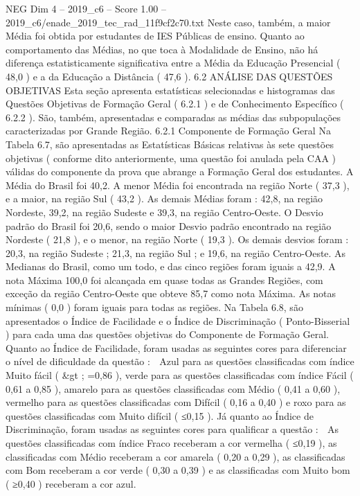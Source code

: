 \begin{textsample}{NEG Dim 4 – 2019\_c6 – Score 1.00 – 2019\_c6/enade\_2019\_tec\_rad\_11f9cf2c70.txt}
Neste caso, também, a maior Média foi obtida por estudantes de IES Públicas de ensino.
Quanto ao comportamento das Médias, no que toca à Modalidade de Ensino, não há diferença estatisticamente significativa entre a Média da Educação Presencial ( 48,0 ) e a da Educação a Distância ( 47,6 ). 6.2 ANÁLISE DAS QUESTÕES OBJETIVAS Esta seção apresenta estatísticas selecionadas e histogramas das Questões Objetivas de Formação Geral ( 6.2.1 ) e de Conhecimento Específico ( 6.2.2 ).
São, também, apresentadas e comparadas as médias das subpopulações caracterizadas por Grande Região. 6.2.1 Componente de Formação Geral Na Tabela 6.7, são apresentadas as Estatísticas Básicas relativas às sete questões objetivas ( conforme dito anteriormente, uma questão foi anulada pela CAA ) válidas do componente da prova que abrange a Formação Geral dos estudantes.
A Média do Brasil foi 40,2.
A menor Média foi encontrada na região Norte ( 37,3 ), e a maior, na região Sul ( 43,2 ).
As demais Médias foram : 42,8, na região Nordeste, 39,2, na região Sudeste e 39,3, na região Centro-Oeste.
O Desvio padrão do Brasil foi 20,6, sendo o maior Desvio padrão encontrado na região Nordeste ( 21,8 ), e o menor, na região Norte ( 19,3 ).
Os demais desvios foram : 20,3, na região Sudeste ; 21,3, na região Sul ; e 19,6, na região Centro-Oeste.
As Medianas do Brasil, como um todo, e das cinco regiões foram iguais a 42,9.
A nota Máxima 100,0 foi alcançada em quase todas as Grandes Regiões, com exceção da região Centro-Oeste que obteve 85,7 como nota Máxima.
As notas mínimas ( 0,0 ) foram iguais para todas as regiões.
Na Tabela 6.8, são apresentados o Índice de Facilidade e o Índice de Discriminação ( Ponto-Bisserial ) para cada uma das questões objetivas do Componente de Formação Geral.
Quanto ao Índice de Facilidade, foram usadas as seguintes cores para diferenciar o nível de dificuldade da questão :  Azul para as questões classificadas com índice Muito fácil ( \&gt ; =0,86 ), verde para as questões classificadas com índice Fácil ( 0,61 a 0,85 ), amarelo para as questões classificadas com Médio ( 0,41 a 0,60 ), vermelho para as questões classificadas com Difícil ( 0,16 a 0,40 ) e roxo para as questões classificadas com Muito difícil ( ≤0,15 ).
Já quanto ao Índice de Discriminação, foram usadas as seguintes cores para qualificar a questão :  As questões classificadas com índice Fraco receberam a cor vermelha ( ≤0,19 ), as classificadas com Médio receberam a cor amarela ( 0,20 a 0,29 ), as classificadas com Bom receberam a cor verde ( 0,30 a 0,39 ) e as classificadas com Muito bom ( ≥0,40 ) receberam a cor azul.

\end{textsample}
